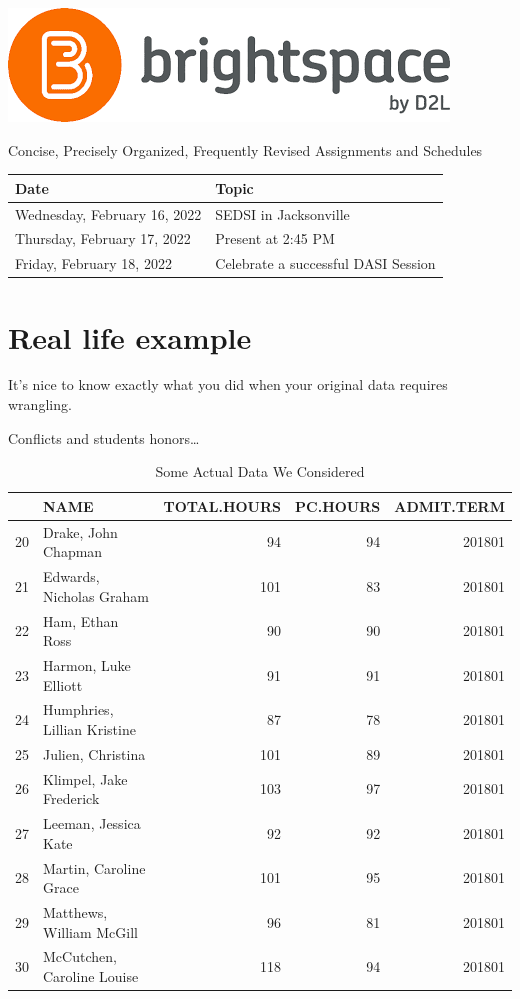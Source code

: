 \documentclass[
]{book}
\begin{document}
\begin{center}\includegraphics{_images/brightspace} \end{center}

Concise, Precisely Organized, Frequently Revised Assignments and Schedules

\begin{longtable}[]{@{}ll@{}}
\toprule
Date & Topic \\
\midrule
\endhead
Wednesday, February 16, 2022 & SEDSI in Jacksonville \\
Thursday, February 17, 2022 & Present at 2:45 PM \\
Friday, February 18, 2022 & Celebrate a successful DASI Session \\
\bottomrule
\end{longtable}

\hypertarget{real-life-example}{%
\chapter{Real life example}\label{real-life-example}}

It's nice to know exactly what you did when your original data requires wrangling.

Conflicts and students honors\ldots{}

\begin{table}

\caption{\label{tab:unnamed-chunk-3}Some Actual Data We Considered}
\centering
\begin{tabular}[t]{l|l|r|r|r}
\hline
  & NAME & TOTAL.HOURS & PC.HOURS & ADMIT.TERM\\
\hline
20 & Drake, John Chapman & 94 & 94 & 201801\\
\hline
21 & Edwards, Nicholas Graham & 101 & 83 & 201801\\
\hline
22 & Ham, Ethan Ross & 90 & 90 & 201801\\
\hline
23 & Harmon, Luke Elliott & 91 & 91 & 201801\\
\hline
24 & Humphries, Lillian Kristine & 87 & 78 & 201801\\
\hline
25 & Julien, Christina & 101 & 89 & 201801\\
\hline
26 & Klimpel, Jake Frederick & 103 & 97 & 201801\\
\hline
27 & Leeman, Jessica Kate & 92 & 92 & 201801\\
\hline
28 & Martin, Caroline Grace & 101 & 95 & 201801\\
\hline
29 & Matthews, William McGill & 96 & 81 & 201801\\
\hline
30 & McCutchen, Caroline Louise & 118 & 94 & 201801\\
\hline
\end{tabular}
\end{table}
\end{document}
